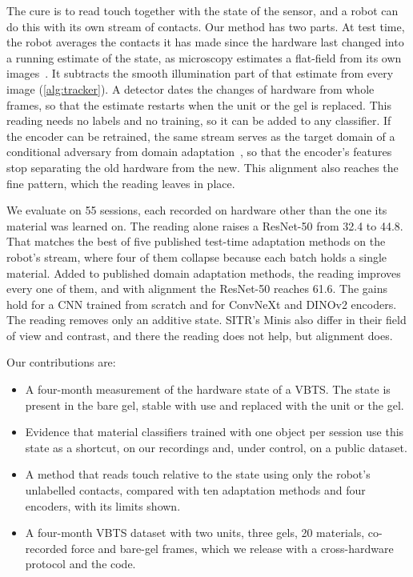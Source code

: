 The cure is to read touch together with the state of the sensor, and a robot can do this with its own stream of contacts. Our method has two parts. At test time, the robot averages the contacts it has made since the hardware last changed into a running estimate of the state, as microscopy estimates a flat-field from its own images~\cite{singh2014illumination,peng2017basic}. It subtracts the smooth illumination part of that estimate from every image (\cref{alg:tracker}). A detector dates the changes of hardware from whole frames, so that the estimate restarts when the unit or the gel is replaced. This reading needs no labels and no training, so it can be added to any classifier. If the encoder can be retrained, the same stream serves as the target domain of a conditional adversary from domain adaptation~\cite{long2018cdan}, so that the encoder's features stop separating the old hardware from the new. This alignment also reaches the fine pattern, which the reading leaves in place.

We evaluate on 55 sessions, each recorded on hardware other than the one its material was learned on. The reading alone raises a ResNet-50 from 32.4 to 44.8\pct. That matches the best of five published test-time adaptation methods on the robot's stream, where four of them collapse because each batch holds a single material. Added to published domain adaptation methods, the reading improves every one of them, and with alignment the ResNet-50 reaches 61.6\pct. The gains hold for a CNN trained from scratch and for ConvNeXt and DINOv2 encoders. The reading removes only an additive state. SITR's Minis also differ in their field of view and contrast, and there the reading does not help, but alignment does.

Our contributions are:
\begin{itemize}\setlength{\itemsep}{1pt}
  \item A four-month measurement of the hardware state of a VBTS. The state is present in the bare gel, stable with use and replaced with the unit or the gel.
  \item Evidence that material classifiers trained with one object per session use this state as a shortcut, on our recordings and, under control, on a public dataset.
  \item A method that reads touch relative to the state using only the robot's unlabelled contacts, compared with ten adaptation methods and four encoders, with its limits shown.
  \item A four-month VBTS dataset with two units, three gels, 20 materials, co-recorded force and bare-gel frames, which we release with a cross-hardware protocol and the code.
\end{itemize}

